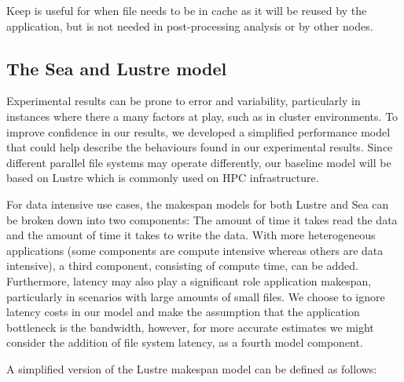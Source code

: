 \documentclass[10pt,journal,compsoc]{IEEEtran}
\begin{document}
Keep is useful for when file needs to be in cache as it will be reused by the
application, but is not needed in post-processing analysis or by other nodes.


\subsection{The Sea and Lustre model}\label{ss:sea-comp:model}

      Experimental results can be prone to error and variability, particularly
      in instances where there a many factors at play, such as in cluster
      environments. To improve confidence in our results, we developed a
      simplified performance model that could help describe the behaviours found
      in our experimental results. Since different parallel file systems may
      operate differently, our baseline model will be based on Lustre which is
      commonly used on HPC infrastructure.

      For data intensive use cases, the makespan models for both Lustre and Sea
      can be broken down into two components: The amount of time it takes read
      the data and the amount of time it takes to write the data. With more
      heterogeneous applications (some components are compute intensive whereas
      others are data intensive), a third component, consisting of compute time,
      can be added. Furthermore, latency may also play a significant role
      application makespan, particularly in scenarios with large amounts of
      small files. We choose to ignore latency costs in our model and make the
      assumption that the application bottleneck is the bandwidth, however, for
      more accurate estimates we might consider the addition of file system
      latency, as a fourth model component.

      A simplified version of the Lustre makespan model can be defined as
      follows:
\end{document}
